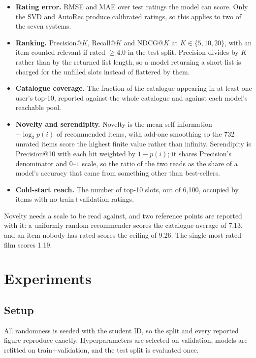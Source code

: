 \documentclass[10pt,twocolumn,letterpaper]{article}
\begin{document}
\begin{itemize}\itemsep2pt
\item \textbf{Rating error.} RMSE and MAE over test ratings the model can
      score. Only the SVD and AutoRec produce calibrated ratings, so this
      applies to two of the seven systems.
\item \textbf{Ranking.} Precision@$K$, Recall@$K$ and NDCG@$K$ at
      $K \in \{5,10,20\}$, with an item counted relevant if rated $\geq 4.0$
      in the test split. Precision divides by $K$ rather than by the returned
      list length, so a model returning a short list is charged for the
      unfilled slots instead of flattered by them.
\item \textbf{Catalogue coverage.} The fraction of the catalogue appearing in
      at least one user's top-10, reported against the whole catalogue and
      against each model's reachable pool.
\item \textbf{Novelty and serendipity.} Novelty is the mean self-information
      $-\log_2 p(i)$ of recommended items, with add-one smoothing so the 732
      unrated items score the highest finite value rather than infinity.
      Serendipity is Precision@10 with each hit weighted by $1-p(i)$; it
      shares Precision's denominator and $0$--$1$ scale, so the ratio of the
      two reads as the share of a model's accuracy that came from something
      other than best-sellers.
\item \textbf{Cold-start reach.} The number of top-10 slots, out of 6,100,
      occupied by items with no train${+}$validation ratings.
\end{itemize}

Novelty needs a scale to be read against, and two reference points are
reported with it: a uniformly random recommender scores the catalogue average
of 7.13, and an item nobody has rated scores the ceiling of 9.26. The single
most-rated film scores 1.19.

\section{Experiments}

\subsection{Setup}
All randomness is seeded with the student ID, so the split and every reported
figure reproduce exactly. Hyperparameters are selected on validation, models
are refitted on train${+}$validation, and the test split is evaluated once.
\end{document}
